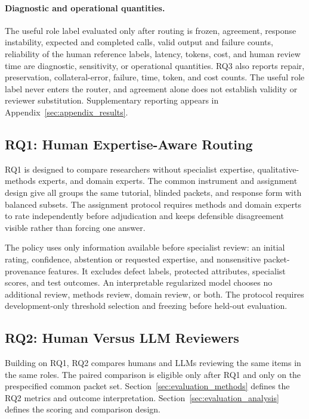 \paragraph{Diagnostic and operational quantities.}
The useful role label evaluated only after routing is frozen, agreement, response instability, expected and completed calls, valid output and failure counts, reliability of the human reference labels, latency, tokens, cost, and human review time are diagnostic, sensitivity, or operational quantities. RQ3 also reports repair, preservation, collateral-error, failure, time, token, and cost counts. The useful role label never enters the router, and agreement alone does not establish validity or reviewer substitution. Supplementary reporting appears in Appendix~\ref{sec:appendix_results}.

\subsection{RQ1: Human Expertise-Aware Routing}

RQ1 is designed to compare researchers without specialist expertise, qualitative-methods experts, and domain experts. The common instrument and assignment design give all groups the same tutorial, blinded packets, and response form with balanced subsets. The assignment protocol requires methods and domain experts to rate independently before adjudication and keeps defensible disagreement visible rather than forcing one answer.

The policy uses only information available before specialist review: an initial rating, confidence, abstention or requested expertise, and nonsensitive packet-provenance features. It excludes defect labels, protected attributes, specialist scores, and test outcomes. An interpretable regularized model chooses no additional review, methods review, domain review, or both. The protocol requires development-only threshold selection and freezing before held-out evaluation.

\subsection{RQ2: Human Versus LLM Reviewers}

Building on RQ1, RQ2 compares humans and LLMs reviewing the same items in the same roles. The paired comparison is eligible only after RQ1 and only on the prespecified common packet set. Section~\ref{sec:evaluation_methods} defines the RQ2 metrics and outcome interpretation. Section~\ref{sec:evaluation_analysis} defines the scoring and comparison design.

